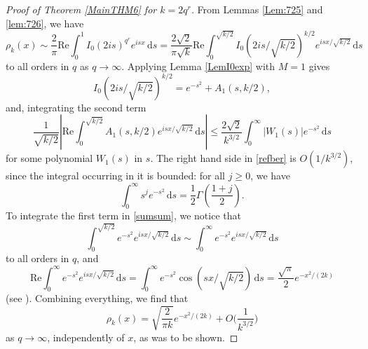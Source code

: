 \documentclass[12pt,reqno]{amsart}
\theoremstyle{definition}
\theoremstyle{plain}
\theoremstyle{definition}
\renewcommand{\geq}{\geqslant}
\renewcommand{\leq}{\leqslant}
\renewcommand{\Re}{\mathrm{Re}}
\renewcommand{\d}{\mathrm{d}}
\begin{document}
\begin{proof}[Proof of Theorem \ref{MainTHM6} for $k=2q^r$]
From Lemmas \ref{Lem:725} and \ref{lem:726}, we have 
\begin{equation}
	\label{RHOKfinal}
	\rho_k(x) \sim \frac{2}{\pi} \Re \int_{0}^{1} I_{0}(2 i s)^{q^r} e^{i s x} \, \d s = \frac{2 \sqrt{2}}{\pi \sqrt{k} }\Re \int_{0}^{\sqrt{k/2}} I_{0}(2 i s/\sqrt{k/2})^{k/2} e^{i s x/ \sqrt{k/2}} \, \d s     
\end{equation}
	to all orders in $q$ as $q \to \infty$. Applying Lemma \ref{LemI0exp} with $M = 1$ gives 
	\begin{equation} \label{sumsum} 
	I_{0}(2 i s/\sqrt{k/2})^{k/2} = e^{-s^2} + A_1(s,k/2), 
	\end{equation} 
	and, integrating the second term 
	\begin{equation} \label{refber} \frac{1}{\sqrt{k/2}}\left|\Re \int_0^{\sqrt{k/2}} A_1(s,k/2) e^{i s x/\sqrt{k/2}} \, \d s \right| \leq  \frac{2\sqrt{2}}{k^{3/2}}
	\int_0^\infty |W_1(s)| e^{-s^2} \, \d s
	\end{equation} 
	for some polynomial $W_1(s)$ in $s$. The right hand side in \eqref{refber} is $O(1/k^{3/2})$, since the integral occurring in it is bounded: for all $j \geq 0$, we have 
	\[
	\int_0^\infty s^j e^{-s^2} \, \d s = \frac{1}{2} \Gamma \left( \frac{1 + j}{2} \right). 
	\]
	To integrate the first term in \eqref{sumsum}, we notice that 
	\[
	\int_0^{\sqrt{k/2}} e^{-s^2} e^{i s x/ \sqrt{k/2}} \, \d s \sim \int_0^{\infty} e^{-s^2} e^{i s x/ \sqrt{k/2}} \, \d s
	\]
	to all orders in $q$, 
	and
	\[
	\Re \int_0^{\infty} e^{-s^2} e^{i s x/ \sqrt{k/2}} \, \d s =
	\int_0^{\infty} e^{-s^2} \cos(s x/ \sqrt{k/2}) \, \d s = \frac{\sqrt{\pi}}{2} e^{-x^2/(2k)}\]
	(see \cite[p. 488]{GR}). 
	Combining everything, we find that 
	\[
	\rho_k(x) = \sqrt{\frac{2}{\pi k}} e^{-x^2/(2k)} +O\Big(\frac{1}{k^{3/2}}\Big)
	\]
as $q \to \infty$, independently of $x$, as was to be shown. \end{proof}
\end{document}
